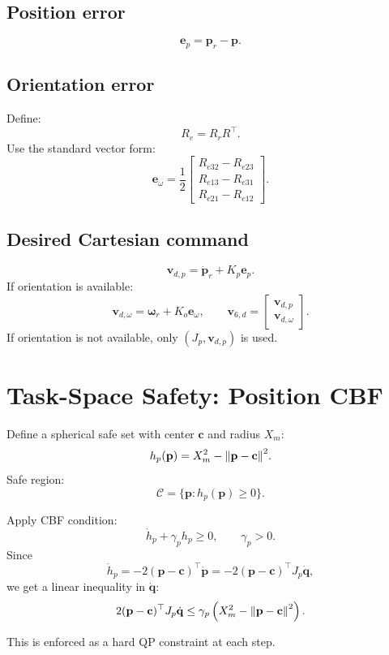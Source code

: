 \documentclass[11pt,a4paper]{article}
\begin{document}
\subsection{Position error}
\[
\mathbf{e}_p=\mathbf{p}_r-\mathbf{p}.
\]

\subsection{Orientation error}
Define:
\[
R_e=R_rR^\top.
\]
Use the standard vector form:
\[
\mathbf{e}_\omega
=
\frac12
\begin{bmatrix}
R_{e32}-R_{e23}\\
R_{e13}-R_{e31}\\
R_{e21}-R_{e12}
\end{bmatrix}.
\]

\subsection{Desired Cartesian command}
\[
\mathbf{v}_{d,p}=\dot{\mathbf{p}}_r+K_p\mathbf{e}_p.
\]
If orientation is available:
\[
\mathbf{v}_{d,\omega}=\bm{\omega}_r+K_o\mathbf{e}_\omega,
\qquad
\mathbf{v}_{6,d}=
\begin{bmatrix}
\mathbf{v}_{d,p}\\
\mathbf{v}_{d,\omega}
\end{bmatrix}.
\]
If orientation is not available, only \((J_p,\mathbf{v}_{d,p})\) is used.

\section{Task-Space Safety: Position CBF}

Define a spherical safe set with center \(\mathbf{c}\) and radius \(X_m\):
\[
h_p(\mathbf{p})=X_m^2-\norm{\mathbf{p}-\mathbf{c}}^2.
\]
Safe region:
\[
\mathcal{C}=\{\mathbf{p}: h_p(\mathbf{p})\ge 0\}.
\]

Apply CBF condition:
\[
\dot{h}_p+\gamma_p h_p\ge 0,\qquad \gamma_p>0.
\]
Since
\[
\dot{h}_p=-2(\mathbf{p}-\mathbf{c})^\top \dot{\mathbf{p}}
       =-2(\mathbf{p}-\mathbf{c})^\top J_p\dot{\mathbf{q}},
\]
we get a linear inequality in \(\dot{\mathbf{q}}\):
\[
2(\mathbf{p}-\mathbf{c})^\top J_p\dot{\mathbf{q}}
\le
\gamma_p\left(X_m^2-\norm{\mathbf{p}-\mathbf{c}}^2\right).
\]

This is enforced as a hard QP constraint at each step.
\end{document}
